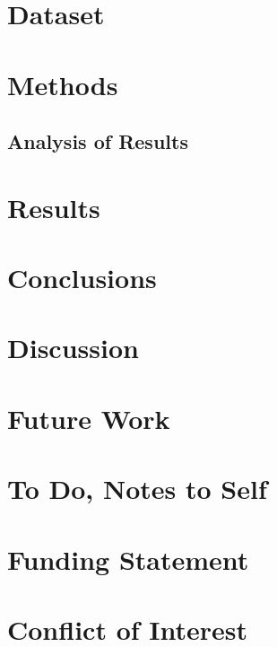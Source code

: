 \documentclass[fleqn]{cas-sc}
\begin{document}
\section{Dataset}\label{Dataset}

\section{Methods}\label{Methods}
%

\subsection{Analysis of Results}\label{Analysis}




\section{Results}\label{Results}
%
%

\section{Conclusions}\label{Conclusions}

\section{Discussion}\label{Discussion}

\section{Future Work}\label{FutureWork}

\section{To Do, Notes to Self}
%

\section*{Funding Statement}

\section*{Conflict of Interest}
\end{document}
